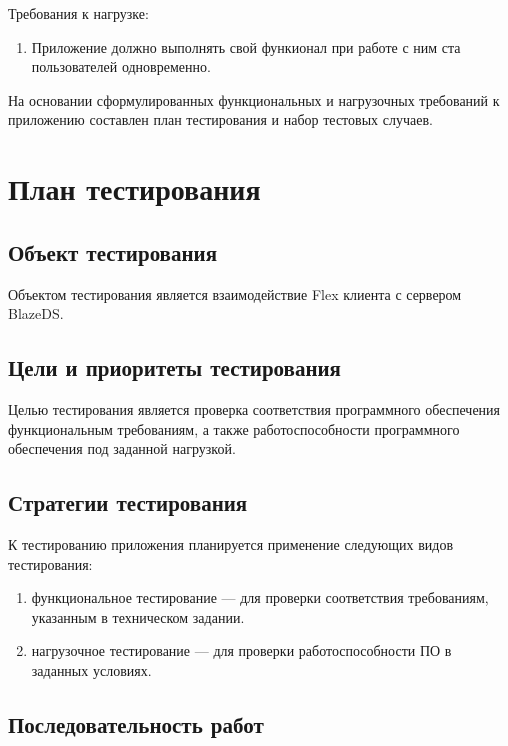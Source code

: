 Требования к нагрузке:

\begin{enumerate}
\item Приложение должно выполнять свой функионал при работе с ним ста пользователей одновременно.
\end{enumerate}

На основании сформулированных функциональных и нагрузочных требований к приложению составлен план тестирования
и набор тестовых случаев.

\section{План тестирования}

\subsection{Объект тестирования}

Объектом тестирования является взаимодействие Flex клиента с сервером BlazeDS.

\subsection{Цели и приоритеты тестирования}

Целью тестирования является проверка соответствия программного обеспечения функциональным требованиям,
а также работоспособности программного обеспечения под заданной нагрузкой.

\subsection{Стратегии тестирования}

К тестированию приложения планируется применение следующих видов тестирования:

\begin{enumerate}
\item функциональное тестирование --- для проверки соответствия требованиям, указанным в техническом задании.
\item нагрузочное тестирование --- для проверки работоспособности ПО в заданных условиях.
\end{enumerate}

\subsection{Последовательность работ}

